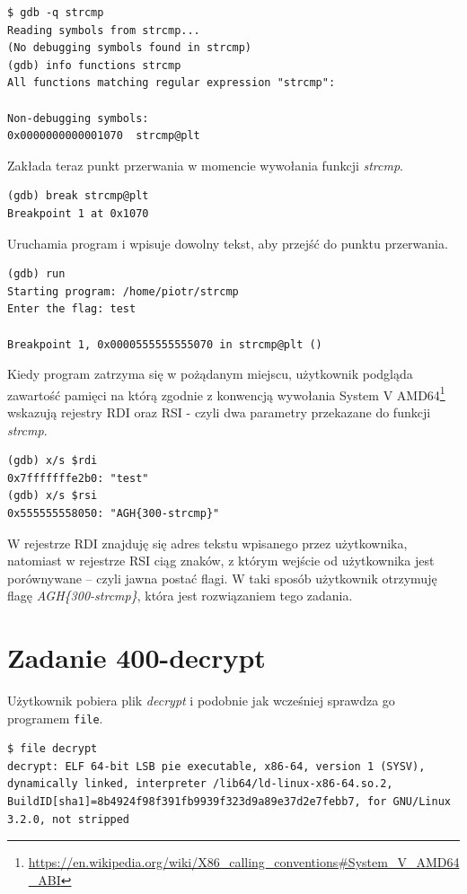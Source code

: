 \documentclass[language=polish,type=eng]{aghmodern}
\begin{document}
\begin{appendices}
\begin{verbatim}
$ gdb -q strcmp
Reading symbols from strcmp...
(No debugging symbols found in strcmp)
(gdb) info functions strcmp
All functions matching regular expression "strcmp":

Non-debugging symbols:
0x0000000000001070  strcmp@plt
\end{verbatim}

Zakłada teraz punkt przerwania w momencie wywołania funkcji \emph{strcmp}.

\begin{verbatim}
(gdb) break strcmp@plt
Breakpoint 1 at 0x1070
\end{verbatim}

Uruchamia program i wpisuje dowolny tekst, aby przejść do punktu przerwania.

\begin{verbatim}
(gdb) run
Starting program: /home/piotr/strcmp 
Enter the flag: test

Breakpoint 1, 0x0000555555555070 in strcmp@plt ()
\end{verbatim}

Kiedy program zatrzyma się w pożądanym miejscu, użytkownik podgląda zawartość pamięci na którą
zgodnie z konwencją wywołania System V AMD64\footnote{
\url{https://en.wikipedia.org/wiki/X86_calling_conventions\#System_V_AMD64_ABI}}
wskazują rejestry RDI oraz RSI - czyli dwa parametry przekazane do funkcji \emph{strcmp}.

\begin{verbatim}
(gdb) x/s $rdi
0x7fffffffe2b0: "test"
(gdb) x/s $rsi
0x555555558050: "AGH{300-strcmp}"
\end{verbatim}

W rejestrze RDI znajduję się adres tekstu wpisanego przez użytkownika, natomiast
w rejestrze RSI ciąg znaków, z którym wejście od użytkownika jest porównywane -- czyli
jawna postać flagi. W taki sposób użytkownik otrzymuję flagę \emph{AGH\{300-strcmp\}},
która jest rozwiązaniem tego zadania.

\section{Zadanie 400-decrypt}

Użytkownik pobiera plik \emph{decrypt} i podobnie jak wcześniej
sprawdza go programem \texttt{file}.

\begin{verbatim}
$ file decrypt
decrypt: ELF 64-bit LSB pie executable, x86-64, version 1 (SYSV), dynamically linked, interpreter /lib64/ld-linux-x86-64.so.2, BuildID[sha1]=8b4924f98f391fb9939f323d9a89e37d2e7febb7, for GNU/Linux 3.2.0, not stripped
\end{verbatim}


\end{appendices}
\end{document}
